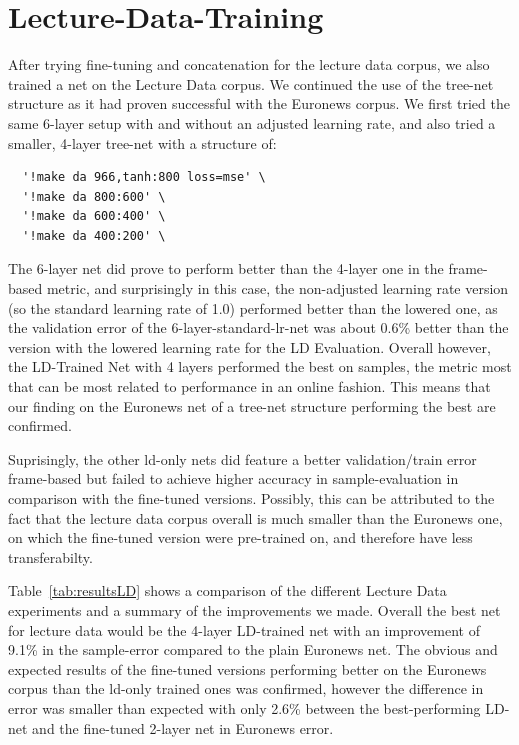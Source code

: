 \section{Lecture-Data-Training}
\label{sec:LIDNetworkLDTraining}

After trying fine-tuning and concatenation for the lecture data corpus, we also trained a net on the Lecture Data corpus. We continued the use of the tree-net structure as it had proven successful with the Euronews corpus.  We first tried the same 6-layer setup with and without an adjusted learning rate, and also tried a smaller, 4-layer tree-net with a structure of:
\begin{verbatim}
  '!make da 966,tanh:800 loss=mse' \
  '!make da 800:600' \
  '!make da 600:400' \
  '!make da 400:200' \
\end{verbatim}

The 6-layer net did prove to perform better than the 4-layer one in the frame-based metric, and surprisingly in this case, the non-adjusted learning rate version (so the standard learning rate of 1.0) performed better than the lowered one, as the validation error of the 6-layer-standard-lr-net was about 0.6\% better than the version with the lowered learning rate for the LD Evaluation.  Overall however, the LD-Trained Net with 4 layers performed the best on samples, the metric most that can be most related to performance in an online fashion. This means that our finding on the Euronews net of a tree-net structure performing the best are confirmed.

Suprisingly, the other ld-only nets did feature a better validation/train error frame-based but failed to achieve higher accuracy in sample-evaluation in comparison with the fine-tuned versions. Possibly, this can be attributed to the fact that the lecture data corpus overall is much smaller than the Euronews one, on which the fine-tuned version were pre-trained on, and therefore have less transferabilty.

Table~\ref{tab:resultsLD} shows a comparison of the different Lecture Data experiments and a summary of the improvements we made. Overall the best net for lecture data would be the 4-layer LD-trained net with an improvement of 9.1\% in the sample-error compared to the plain Euronews net. The obvious and expected results of the fine-tuned versions performing better on the Euronews corpus than the ld-only trained ones was confirmed, however the difference in error was smaller than expected with only 2.6\% between the best-performing LD-net and the fine-tuned 2-layer net in Euronews error.


